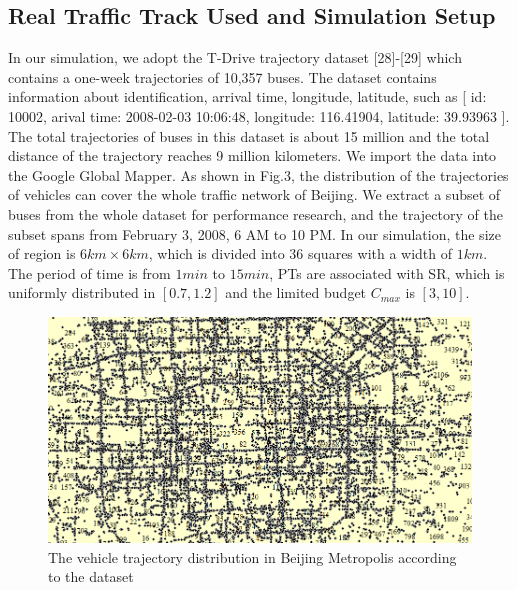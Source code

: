 \documentclass[journal]{IEEEtran}
\begin{document}
\subsection{Real Traffic Track Used and Simulation Setup}
In our simulation, we adopt the T-Drive trajectory dataset [28]-[29] which contains a one-week trajectories of 10,357 buses. The dataset contains information about identification, arrival time, longitude, latitude, such as [ id: 10002, arival time: 2008-02-03 10:06:48, longitude: 116.41904, latitude: 39.93963 ]. The total trajectories of buses in this dataset is about 15 million and the total distance of the trajectory reaches 9 million kilometers. We import the data into the Google Global Mapper. As shown in Fig.3, the distribution of the trajectories of vehicles can cover the whole traffic network of Beijing. We extract a subset of buses from the whole dataset for performance research, and the trajectory of the subset spans from February 3, 2008, 6 AM to 10 PM. In our simulation, the size of region is $6km\times 6km$, which is divided into 36 squares with a width of $1km$. The period of time is from $1min$ to $15min$, PTs are associated with SR, which is uniformly distributed in $[0.7, 1.2]$ and the limited budget $C_{max}$ is $[3, 10]$. 
\begin{figure}
	\centering
	\includegraphics[width=0.85\linewidth]{fig3-1.png}
	\caption{The vehicle trajectory distribution in Beijing Metropolis according to the dataset}
	\label{fig:figure4}
\end{figure} 
\end{document}
